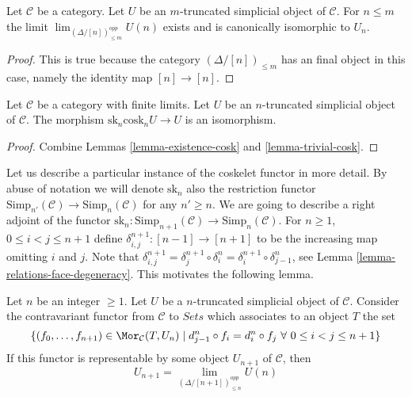 \begin{lemma}
\label{lemma-trivial-cosk}
Let $\mathcal{C}$ be a category.
Let $U$ be an $m$-truncated simplicial object of $\mathcal{C}$.
For $n \leq m$ the limit $\lim_{(\Delta/[n])_{\leq m}^{opp}} U(n)$
exists and is canonically isomorphic to $U_n$.
\end{lemma}

\begin{proof}
This is true because the category $(\Delta/[n])_{\leq m}$
has an final object in this case, namely the identity
map $[n] \to [n]$.
\end{proof}

\begin{lemma}
\label{lemma-recover-cosk}
Let $\mathcal{C}$ be a category with finite limits.
Let $U$ be an $n$-truncated simplicial object of $\mathcal{C}$.
The morphism $\text{sk}_n \text{cosk}_n U \to U$
is an isomorphism.
\end{lemma}

\begin{proof}
Combine Lemmas \ref{lemma-existence-cosk} and \ref{lemma-trivial-cosk}.
\end{proof}

\noindent
Let us describe a particular instance of the coskelet functor in more detail.
By abuse of notation we will denote $\text{sk}_n$
also the restriction functor
$\text{Simp}_{n'}(\mathcal{C}) \to \text{Simp}_n(\mathcal{C})$
for any $n' \geq n$. We are going to describe a right adjoint
of the functor
$\text{sk}_n : \text{Simp}_{n + 1}(\mathcal{C})
\to \text{Simp}_n(\mathcal{C})$.
For $n \geq 1$, $0 \leq i < j \leq n + 1$
define $\delta^{n + 1}_{i, j} : [n - 1] \to [n + 1]$
to be the increasing map omitting $i$ and $j$.
Note that
$\delta^{n + 1}_{i, j} =
\delta^{n + 1}_j \circ \delta^n_i =
\delta^{n + 1}_i \circ \delta^n_{j - 1}$, see
Lemma \ref{lemma-relations-face-degeneracy}. This motivates
the following lemma.

\begin{lemma}
\label{lemma-formula-limit}
Let $n$ be an integer $\geq 1$.
Let $U$ be a $n$-truncated simplicial object of $\mathcal{C}$.
Consider the contravariant functor from $\mathcal{C}$ to
$\textit{Sets}$ which associates to an object $T$ the set
$$
\{ (f_0, \ldots, f_{n + 1}) \in \Mor_\mathcal{C}(T, U_n)
\mid
d^n_{j - 1} \circ f_i = d^n_i \circ f_j
\ \forall\ 0\leq i < j\leq n + 1\}
$$
If this functor is representable by some object $U_{n + 1}$
of $\mathcal{C}$, then
$$
U_{n + 1} = \lim_{(\Delta/[n + 1])_{\leq n}^{opp}} U(n)
$$
\end{lemma}

